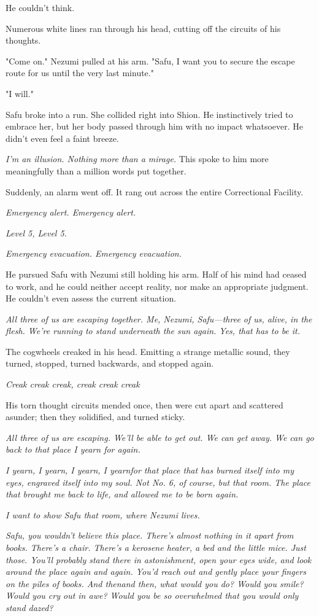 He couldn't think.

Numerous white lines ran through his head, cutting off the circuits of
his thoughts.

"Come on." Nezumi pulled at his arm. "Safu, I want you to secure the
escape route for us until the very last minute."

"I will."

Safu broke into a run. She collided right into Shion. He instinctively
tried to embrace her, but her body passed through him with no impact
whatsoever. He didn't even feel a faint breeze.

\emph{I'm an illusion. Nothing more than a mirage.} This spoke to him more
meaningfully than a million words put together.

Suddenly, an alarm went off. It rang out across the entire Correctional
Facility.

\emph{Emergency alert. Emergency alert.}

\emph{Level 5, Level 5.}

\emph{Emergency evacuation. Emergency evacuation.}

He pursued Safu with Nezumi still holding his arm. Half of his mind had
ceased to work, and he could neither accept reality, nor make an
appropriate judgment. He couldn't even assess the current situation.

\emph{All three of us are escaping together. Me, Nezumi, Safu---three of us,
alive, in the flesh. We're running to stand underneath the sun again.
Yes, that has to be it.}

The cogwheels creaked in his head. Emitting a strange metallic sound,
they turned, stopped, turned backwards, and stopped again.

\emph{Creak creak creak, creak creak creak\el }

His torn thought circuits mended once, then were cut apart and scattered
asunder; then they solidified, and turned sticky.

\emph{All three of us are escaping. We'll be able to get out. We can get away.
We can go back to that place I yearn for again.}

\emph{I yearn, I yearn, I yearn, I yearn\el for that place that has burned
itself into my eyes, engraved itself into my soul. Not No. 6, of course,
but that room. The place that brought me back to life, and allowed me to
be born again.}

\emph{I want to show Safu that room, where Nezumi lives.}

\emph{Safu, you wouldn't believe this place. There's almost nothing in it
apart from books. There's a chair. There's a kerosene heater, a bed\el 
and the little mice. Just those. You'll probably stand there in
astonishment, open your eyes wide, and look around the place again and
again. You'd reach out and gently place your fingers on the piles of
books. And then\el and then, what would you do? Would you smile? Would
you cry out in awe? Would you be so overwhelmed that you would only
stand dazed?}

